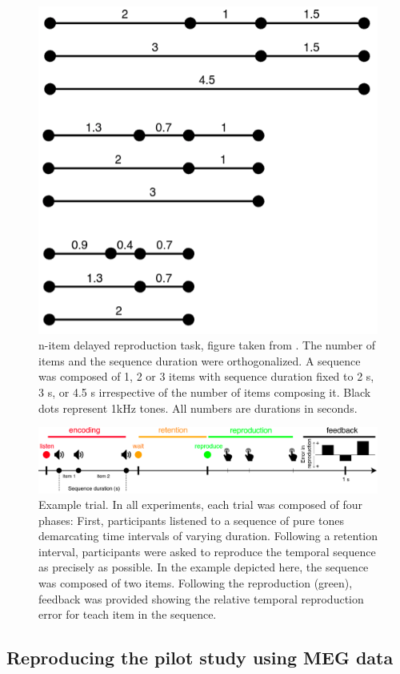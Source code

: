 \begin{figure}
   \centering
   \includegraphics[width=0.5\linewidth]{images_report/paradigme_experiment_2.png}
    \caption[List of possible sequences.]%
    {n-item delayed reproduction task, figure taken from \cite{herbst2021abstracting}. The number of items and the sequence duration were orthogonalized. A sequence was composed of 1, 2 or 3 items with sequence duration fixed to 2 s, 3 s, or 4.5 s irrespective of the number of items composing it. Black dots represent 1kHz tones. All numbers are durations in seconds.}
    \label{fig:experiment_2}
\end{figure}

\begin{figure}
   \includegraphics[width=1.\linewidth]{images_report/encoding_retention_reproduction.png}
   \caption[Example trial]%
   {Example trial. In all experiments, each trial was composed of four phases: First, participants listened to a sequence of pure tones demarcating time intervals of varying duration. Following a retention interval, participants were asked to reproduce the temporal sequence as precisely as possible. In the example depicted here, the sequence was composed of two items. Following the reproduction (green), feedback was provided showing the relative temporal reproduction error for teach item in the sequence.}
   \label{paradigm}
\end{figure}
 
 
\subsection{Reproducing the pilot study using MEG data}
 
